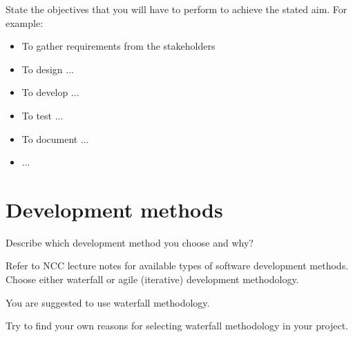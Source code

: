 State the objectives that you will have to perform to achieve the stated aim. For example:
\begin{itemize}
  \item To gather requirements from the stakeholders
  \item To design ...
  \item To develop ...
  \item To test ...
  \item To document ...
  \item ...
\end{itemize}

\section{Development methods} %
\label{sec:development_methods}
Describe which development method you choose and why?

Refer to NCC lecture notes for available types of software development methods. Choose either waterfall or agile (iterative) development methodology.

You are suggested to use waterfall methodology.

Try to find your own reasons for selecting waterfall methodology in your project.
